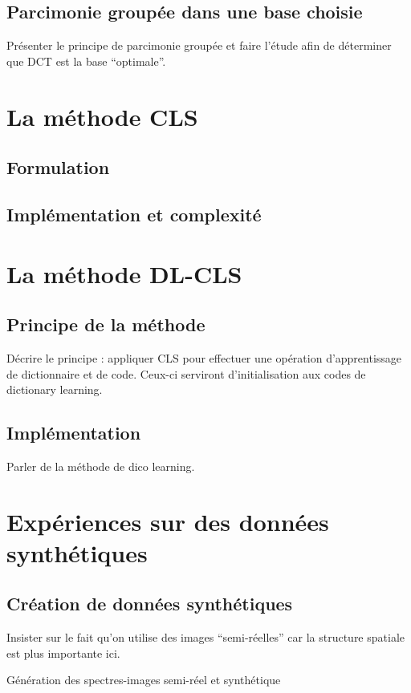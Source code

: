 \documentclass[a4paper, twoside, table, justified,
               nofonts, nobib, nohyper, 10pt, french]{tufte-book}
\begin{document}
\subsection{Parcimonie groupée dans une base choisie}
Présenter le principe de parcimonie groupée et faire l'étude afin de déterminer que DCT est la base ``optimale''.

%
\section{La méthode CLS}

\subsection{Formulation}

\subsection{Implémentation et complexité}

%
\section{La méthode DL-CLS}

\subsection{Principe de la méthode}
Décrire le principe : appliquer CLS pour effectuer une opération d'apprentissage de dictionnaire et de code. Ceux-ci serviront d'initialisation aux codes de dictionary learning.

\subsection{Implémentation}
Parler de la méthode de dico learning.

%
\section{Expériences sur des données synthétiques}

\subsection{Création de données synthétiques}
Insister sur le fait qu'on utilise des images ``semi-réelles'' car la structure spatiale est plus importante ici.

Génération des spectres-images semi-réel et synthétique
\end{document}
